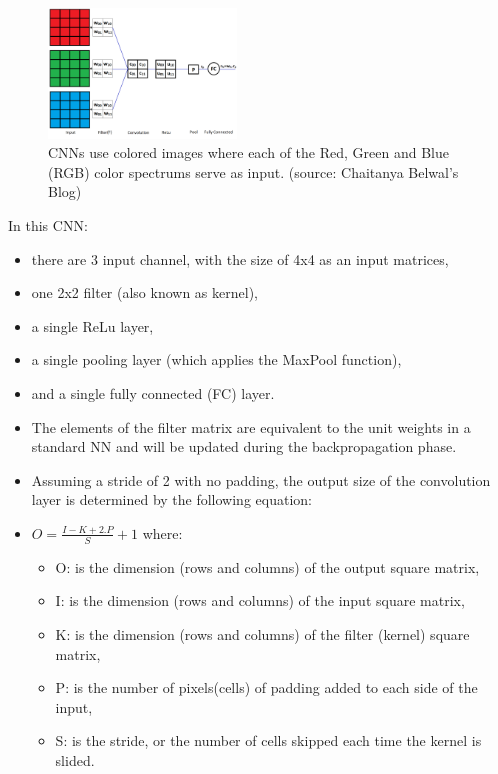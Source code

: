 

\begin{vbframe}

 \begin{figure}
    \centering
    \includegraphics[width=5cm]{figure/3channel.png}
    \caption{\tiny CNNs use colored images where each of the Red, Green and Blue (RGB) color spectrums serve as input. (source: Chaitanya Belwal's Blog)}
  \end{figure}

In this CNN:
    \begin{itemize}
       \item there are 3 input channel, with the size of 4x4 as an input matrices, 
       \item one 2x2 filter (also known as kernel), 
       \item a single ReLu layer,
       \item a single pooling layer (which applies the MaxPool function),
       \item and a single fully connected (FC) layer.
    \end{itemize}

    \begin{itemize}
       \item The elements of the filter matrix are equivalent to the unit weights in a standard NN and will be updated during the backpropagation phase.
       \item Assuming a stride of 2 with no padding, the output size of the convolution layer is determined by the following equation:
       \item $ O = \frac{I - K + 2.P}{S} + 1$ where: 
    \begin{itemize}
       \item O: is the dimension (rows and columns) of the output square matrix, 
       \item I: is the dimension (rows and columns) of the input square matrix,
       \item K: is the dimension (rows and columns) of the filter (kernel) square matrix, 
       \item P: is the number of pixels(cells) of padding added to each side of the input,
       \item S: is the stride, or the number of cells skipped each time the kernel is slided.
    \end{itemize}
    \end{itemize}


\end{vbframe}
